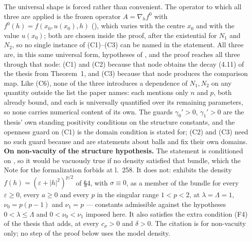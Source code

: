 \begin{theorem}[Theorem 3]
The universal shape is forced rather than convenient.  The operator to which all
three are applied is the frozen operator $A=\nabla_hf^0$ with
$f^0(h)=f(x_0,u(x_0),h)$ (), which varies with
the centre $x_0$ and with the value $u(x_0)$; both are chosen inside the proof,
after the existential for $N_1$ and $N_2$, so no single instance of (C1)--(C3)
can be named in the statement.  All three are, in this same universal form, hypotheses of
, and the proof reaches all three through that
node: (C1) and (C2) because that node obtains the decay (4.11) of the thesis from
Theorem~1, and (C3) because that node produces the comparison map.  Like (C6), none of the three introduces a
dependence of $N_1,N_2$ on any quantity outside the list the paper names: each
mentions only $n$ and $p$, both already bound, and each is universally
quantified over its remaining parameters, so none carries numerical content of
its own.  The guards $\gamma_0'>0$, $\gamma_1'>0$ are the thesis' own standing
positivity conditions on the structure constants, and the openness guard on (C1)
is the domain condition  is stated for; (C2) and
(C3) need no such guard because  and
 are statements about balls and fix their own
domains.
\textbf{On non-vacuity of the structure hypothesis.}  The statement is
conditioned on , so it would be vacuously true
if no density satisfied that bundle, which the Note for the formalization forbids
at l.~258.  It does not:  exhibits the density
$f(h)=(\varepsilon+|h|^2)^{p/2}$ of \S4, with $\sigma\equiv0$, as a member of the
bundle for every $\varepsilon\ge0$, every $a\ge0$ and every $p$ in the singular
range $1<p<2$, at $\lambda=\Lambda=1$, $\nu_0=p(p-1)$ and $\nu_1=p$ --- constants
admissible against the hypotheses $0<\lambda\le\Lambda$ and $0<\nu_0<\nu_1$
imposed here.  It also satisfies the extra condition (F4) of the thesis that
 adds, at every $c_\sigma>0$ and $\delta>0$.  The
citation is for non-vacuity only; no step of the proof below uses the model
density.
\end{theorem}
